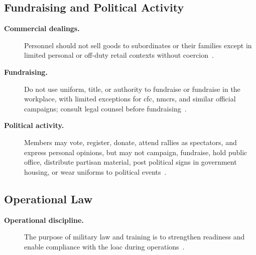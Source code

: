 \documentclass[../main.tex]{subfiles}
\begin{document}
\subsection{Fundraising and Political Activity}
\begin{description}
  \item[\textbf{Commercial dealings.}] Personnel should not sell goods to subordinates or their families except in limited personal or off-duty retail contexts without coercion~\autocite{edo-5-1-1-naval-justice-standards-2025}.
  \item[\textbf{Fundraising.}] Do not use uniform, title, or authority to fundraise or fundraise in the workplace, with limited exceptions for \ac{cfc}, \ac{nmcrs}, and similar official campaigns; consult legal counsel before fundraising~\autocite{edo-5-1-1-naval-justice-standards-2025,eCFR-5CFR2635-808-Fundraising-2026,DoD-JER-2024}.
  \item[\textbf{Political activity.}] Members may vote, register, donate, attend rallies as spectators, and express personal opinions, but may not campaign, fundraise, hold public office, distribute partisan material, post political signs in government housing, or wear uniforms to political events~\autocite{edo-5-1-1-naval-justice-standards-2025,DoDD-1344-10-Political-Activities,DoD-SOCO-Political-Activities-Deskbook-2025}.
\end{description}

\subsection{Operational Law}
\begin{description}
  \item[\textbf{Operational discipline.}] The purpose of military law and training is to strengthen readiness and enable compliance with the \ac{loac} during operations~\autocite{edo-5-1-1-naval-justice-standards-2025}.
\end{description}
\end{document}
